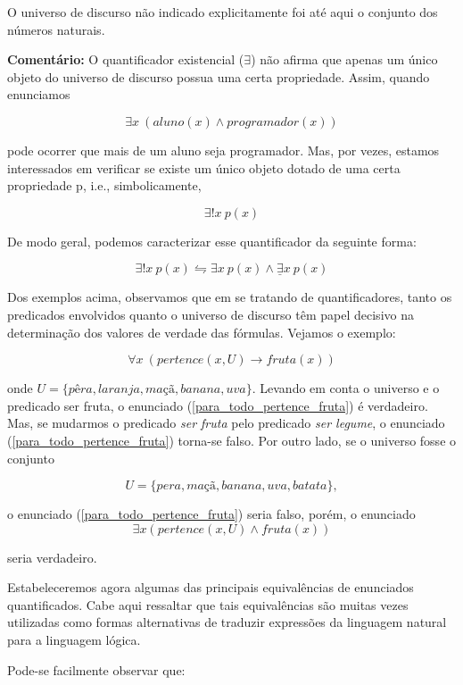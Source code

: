 \noindent O universo de discurso não indicado explicitamente foi até aqui o conjunto dos números naturais.

\noindent \textbf{Comentário:} O quantificador existencial ($\exists$) não afirma que apenas um único objeto do universo de discurso possua uma certa propriedade.
Assim, quando enunciamos

$$\exists x\ (aluno(x) \land programador(x))$$

\noindent pode ocorrer que mais de um aluno seja programador.
Mas, por vezes, estamos interessados em verificar se existe um único objeto dotado de uma certa propriedade p, i.e., simbolicamente,

$$\exists! x\ p(x)$$

De modo geral, podemos caracterizar esse quantificador da seguinte forma:

$$\exists! x\ p(x) \leftrightharpoons \exists x\ p(x) \land \underline{\exists}x\ p(x)$$

Dos exemplos acima, observamos que em se tratando de quantificadores, tanto os predicados envolvidos quanto o universo de discurso têm papel decisivo na determinação dos valores de verdade das fórmulas.
Vejamos o exemplo:

\begin{equation}\label{para_todo_pertence_fruta}
    \forall x\ (pertence(x, U) \to fruta (x)) \tag{1}
\end{equation}

\noindent onde $U = \{pêra, laranja, maçã, banana, uva\}$.
Levando em conta o universo e o predicado ser fruta, o enunciado (\ref{para_todo_pertence_fruta}) é verdadeiro.
Mas, se mudarmos o predicado \textit{ser fruta} pelo predicado \textit{ser legume}, o enunciado (\ref{para_todo_pertence_fruta}) torna-se falso.
Por outro lado, se o universo fosse o conjunto

$$U = \{pera, maçã, banana, uva, batata\},$$

\noindent o enunciado (\ref{para_todo_pertence_fruta}) seria falso, porém, o enunciado
$$\exists x (pertence(x, U) \land fruta(x))$$

\noindent seria verdadeiro.

Estabeleceremos agora algumas das principais equivalências de enunciados quantificados.
Cabe aqui ressaltar que tais equivalências são muitas vezes utilizadas como formas alternativas de traduzir expressões da linguagem natural para a linguagem lógica.

\bigskip
Pode-se facilmente observar que:

